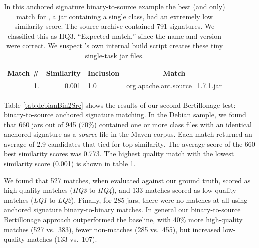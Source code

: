 \begin{table}[h]
    \centering
    \begin{tabular}[htbp]{r|r|l|l}
        \textbf{Match \#}  & \textbf{Similarity} & \textbf{Inclusion} & \multicolumn{1}{c}{\textbf{Match}} \\
        \hline
        1.        & 0.001 & 1.0   &         org.apache.ant.source\_1.7.1.jar \\
    \end{tabular}
    \caption{
    In this anchored signature binary-to-source example the best (and only)
    match for , a jar containing a single
    class, had an extremely low similarity score.  The source archive
    contained 791 signatures.  We classified this as HQ3. ``Expected
    match,'' since the name and version were correct.  We suspect
    's own internal build script creates these tiny single-task
    jar files.
    }
    \label{tab:001similarity}
\end{table}


Table \ref{tab:debianBin2Src} shows the results of our second Bertillonage
test:  binary-to-source anchored signature matching.  In the Debian sample,
we found that 660 jars out of 945 (70\%) contained one or more class files
with an identical anchored signature as a \emph{source} file in the Maven
corpus.  Each match returned an average of 2.9 candidates that tied for top
similarity.  The average score of the 660 best similarity scores was
0.773.  The highest quality match with the lowest similarity score (0.001)
is shown in table \ref{tab:001similarity}.

We found that 527 matches, when evaluated against our ground truth, scored
as high quality matches (\emph{HQ3} to \emph{HQ4}), and 133 matches scored
as low quality matches (\emph{LQ1} to \emph{LQ2}).  Finally, for 285 jars,
there were no matches at all using anchored signature binary-to-binary
matches.  In general our binary-to-source Bertillonage approach
outperformed the baseline, with 40\% more high-quality matches (527 vs.\
383), fewer non-matches (285 vs.\ 455), but increased low-quality matches
(133 vs.\ 107).



